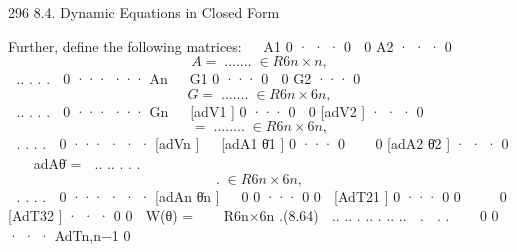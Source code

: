 \documentclass[12pt,a4paper]{article}
\begin{document}
296                                                   8.4. Dynamic Equations in Closed Form

Further, define the following matrices:
                                                      
                       A1 0 · · · 0
                    0 A2 · · · 0                      
                                                      
\begin{equation}
A =  .           .. ..     ..               ∈ R6n×n ,
\label{eq:8.60}
\end{equation}
                    ..       .    .    .              
                              0    ···    ···    An
                                                     
                       G1          0     ···     0
                      0           G2    ···     0    
                                                     
\begin{equation}
G    =  .            ..   ..      ..    ∈ R6n×6n ,
\label{eq:8.61}
\end{equation}
                      ..            .      .     .   
                             0     ···   ···    Gn
                                                             
                       [adV1 ]    0         ···            0
                        0     [adV2 ] · · ·               0  
                                                             
\begin{equation}
[adV ]   =     ..       ..       ..             ..  ∈ R6n×6n ,
\label{eq:8.62}
\end{equation}
                          .        .           .           . 
                     0           ···        · · · [adVn ]
                                                                       
                   [adA1 θ̇1 ]           0           ···       0
                    0          [adA2 θ̇2 ] · · ·            0        
                                                                       
         adAθ̇ =       ..               ..          . .        .
\begin{equation}
.        ∈ R6n×6n ,
\label{eq:8.63}
\end{equation}
                        .                .              .      .       
                       0               ···           · · · [adAn θ̇n ]
                                                                            
                      0               0           ···         0           0
                  [AdT21 ]           0           ···         0           0 
                                                                            
                     0          [AdT32 ] · · ·               0           0 
         W(θ) =                                                              ∈ R6n×6n .(8.64)
                     ..              ..          . ..        .
                                                              ..          .. 
                                                                          .
                      .               .                                     
                                                                     
                      0               0           · · · AdTn,n−1          0
\end{document}
